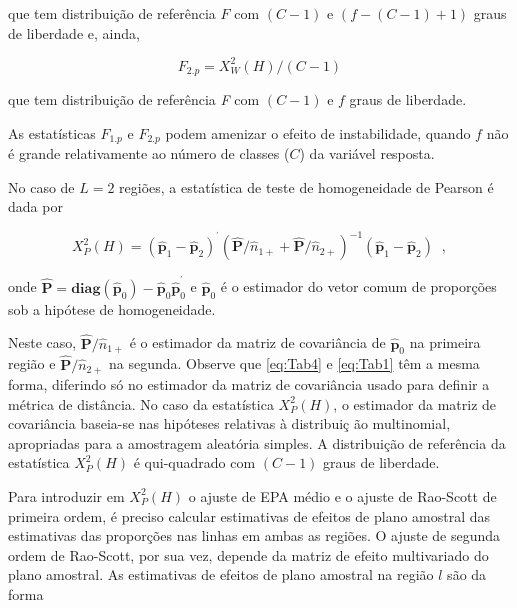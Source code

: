 \documentclass[]{book}
\numberwithin{example}{chapter}
\numberwithin{remark}{chapter}
\numberwithin{definition}{chapter}
\begin{document}
que tem distribuição de referência \(F\) com \(\left(C-1\right)\) e
\(\left( f-\left( C-1\right)+1\right)\) graus de liberdade e, ainda,

\begin{equation}
F_{2.p}=X_{W}^{2}\left( H\right) /\left(C-1\right) \label{eq:Tab3}
\end{equation}

que tem distribuição de referência \emph{F} com \(\left(C-1\right)\) e
\(f\) graus de liberdade.

As estatísticas \(F_{1.p}\) e \(F_{2.p}\) podem amenizar o efeito de
instabilidade, quando \(f\) não é grande relativamente ao número de
classes (\(C\)) da variável resposta.

No caso de \(L=2\) regiões, a estatística de teste de homogeneidade de
Pearson é dada por

\begin{equation}
X_{P}^{2}\left( H\right) =\left( \mathbf{\hat{p}}_{1}-\mathbf{\hat{p}}
_{2}\right) ^{^{\prime }}\left( \mathbf{\hat{P}}/\widehat{n}_{1+}+\mathbf{
\hat{P}}/\widehat{n}_{2+}\right) ^{-1}\left( \mathbf{\hat{p}}_{1}-\mathbf{
\hat{p}}_{2}\right) \;\;,  \label{eq:Tab4}
\end{equation}

onde
\(\mathbf{\hat{P}=diag}\left( \mathbf{\hat{p}}_{0}\right) -\mathbf{\hat{p }}_{0}\mathbf{\hat{p}}_{0}^{^{\prime }}\)
e \(\mathbf{\hat{p}}_{0}\) é o estimador do vetor comum de proporções
sob a hipótese de homogeneidade.

Neste caso, \(\mathbf{\hat{P}}/\widehat{n}_{1+}\) é o estimador da
matriz de covariância de \(\mathbf{\hat{p}}_{0}\) na primeira região e
\(\mathbf{\hat{P}}/\widehat{n}_{2+}\) na segunda. Observe que
\eqref{eq:Tab4} e \eqref{eq:Tab1} têm a mesma forma, diferindo só no
estimador da matriz de covariância usado para definir a métrica de
distância. No caso da estatística \(X_{P}^{2}\left( H\right)\), o
estimador da matriz de covariância baseia-se nas hipóteses relativas à
distribuiç ão multinomial, apropriadas para a amostragem aleatória
simples. A distribuição de referência da estatística
\(X_{P}^{2}\left( H\right)\) é qui-quadrado com \(\left( C-1\right)\)
graus de liberdade.

Para introduzir em \(X_{P}^{2}\left( H\right)\) o ajuste de EPA médio e
o ajuste de Rao-Scott de primeira ordem, é preciso calcular estimativas
de efeitos de plano amostral das estimativas das proporções nas linhas
em ambas as regiões. O ajuste de segunda ordem de Rao-Scott, por sua
vez, depende da matriz de efeito multivariado do plano amostral. As
estimativas de efeitos de plano amostral na região \(l\) são da forma
\end{document}
